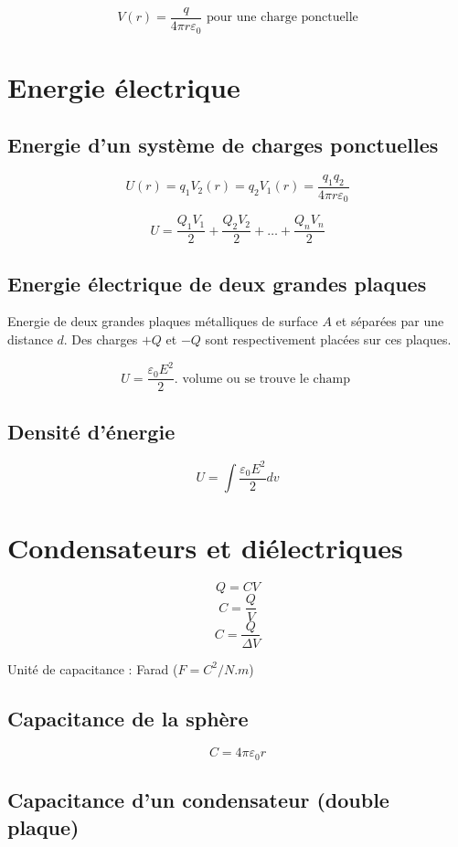 \documentclass[a4paper,10pt,openright,titlepage]{report}
\begin{document}
$$V(r) = \frac{q}{4 \pi r \varepsilon_0} \mbox{ pour une charge ponctuelle}$$

\section{Energie électrique}

\subsection{Energie d'un système de charges ponctuelles}

$$U(r) = q_1 V_2(r) = q_2 V_1(r)= \frac{q_1 q_2}{4 \pi r \varepsilon_0}$$

$$U = \frac{Q_1 V_1}{2}+ \frac{Q_2 V_2}{2} + \ldots + \frac{Q_n V_n}{2}$$

\subsection{Energie électrique de deux grandes plaques}

Energie de deux grandes plaques métalliques de surface $A$ et séparées par une distance $d$. Des charges $+Q$ et $-Q$ sont respectivement placées sur ces plaques. 

$$U = \frac{\varepsilon_0 E^2}{2} . \mbox{ volume ou se trouve le champ }$$

\subsection{Densité d'énergie}

$$U=\int \frac{\varepsilon_0 E^2}{2} dv$$

\section{Condensateurs et diélectriques}

$$Q=CV$$
$$C=\frac{Q}{V}$$
$$C=\frac{Q}{\Delta V}$$

Unité de capacitance : Farad ($F = C^2/{N.m}$)

\subsection{Capacitance de la sphère}

$$C=4 \pi \varepsilon_0 r$$

\subsection{Capacitance d'un condensateur (double plaque)}
\end{document}
